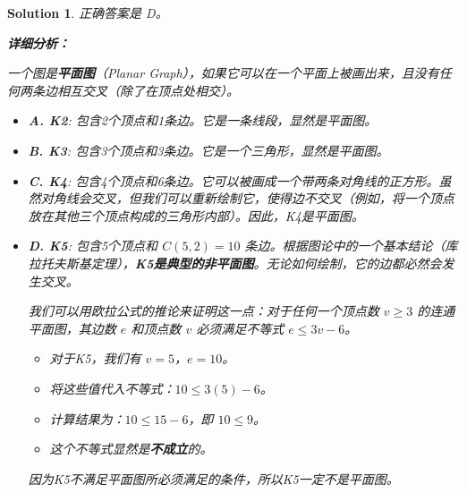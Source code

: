 \documentclass[UTF8]{report}
\newtheorem{solution}{Solution}
\theoremstyle{MyLineTheoremStyle} %
\theoremstyle{MyBlockTheoremStyle} %
\theoremstyle{MySubsubsectionStyle} %
\begin{document}
\begin{solution}
正确答案是 D。

\textbf{详细分析：}

一个图是\textbf{平面图}（Planar Graph），如果它可以在一个平面上被画出来，且没有任何两条边相互交叉（除了在顶点处相交）。

\begin{itemize}
    \item \textbf{A. K2}: 包含2个顶点和1条边。它是一条线段，显然是平面图。
    \begin{center}
    \end{center}

    \item \textbf{B. K3}: 包含3个顶点和3条边。它是一个三角形，显然是平面图。
    \begin{center}
    \end{center}

    \item \textbf{C. K4}: 包含4个顶点和6条边。它可以被画成一个带两条对角线的正方形。虽然对角线会交叉，但我们可以重新绘制它，使得边不交叉（例如，将一个顶点放在其他三个顶点构成的三角形内部）。因此，K4是平面图。
    \begin{center}
    \end{center}

    \item \textbf{D. K5}: 包含5个顶点和 $C(5,2) = 10$ 条边。根据图论中的一个基本结论（库拉托夫斯基定理），\textbf{K5是典型的非平面图}。无论如何绘制，它的边都必然会发生交叉。

    我们可以用欧拉公式的推论来证明这一点：对于任何一个顶点数 $v \ge 3$ 的连通平面图，其边数 $e$ 和顶点数 $v$ 必须满足不等式 $e \le 3v - 6$。
    \begin{itemize}
        \item 对于K5，我们有 $v=5$，$e=10$。
        \item 将这些值代入不等式：$10 \le 3(5) - 6$。
        \item 计算结果为：$10 \le 15 - 6$，即 $10 \le 9$。
        \item 这个不等式显然是\textbf{不成立}的。
    \end{itemize}
    因为K5不满足平面图所必须满足的条件，所以K5一定不是平面图。
\end{itemize}
\end{solution}
\end{document}
